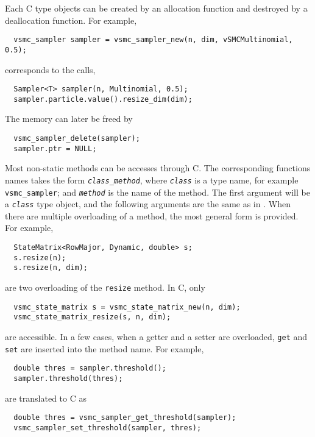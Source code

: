 Each C type objects can be created by an allocation function and destroyed by a
deallocation function. For example,
\begin{Verbatim}
  vsmc_sampler sampler = vsmc_sampler_new(n, dim, vSMCMultinomial, 0.5);
\end{Verbatim}
corresponds to the \cpp calls,
\begin{Verbatim}
  Sampler<T> sampler(n, Multinomial, 0.5);
  sampler.particle.value().resize_dim(dim);
\end{Verbatim}
The memory can later be freed by
\begin{Verbatim}
  vsmc_sampler_delete(sampler);
  sampler.ptr = NULL;
\end{Verbatim}
Most non-static methods can be accesses through C. The corresponding functions
names takes the form
\texttt{\textcolor{MRed}{\textit{class}}\_\textcolor{MRed}{\textit{method}}},
where \texttt{\textcolor{MRed}{\textit{class}}} is a type name, for example
\verb|vsmc_sampler|; and \texttt{\textcolor{MRed}{\textit{method}}} is the name
of the method. The first argument will be a
\texttt{\textcolor{MRed}{\textit{class}}} type object, and the following
arguments are the same as in \cpp. When there are multiple overloading of a
method, the most general form is provided. For example,
\begin{Verbatim}
  StateMatrix<RowMajor, Dynamic, double> s;
  s.resize(n);
  s.resize(n, dim);
\end{Verbatim}
are two overloading of the \verb|resize| method. In C, only
\begin{Verbatim}
  vsmc_state_matrix s = vsmc_state_matrix_new(n, dim);
  vsmc_state_matrix_resize(s, n, dim);
\end{Verbatim}
are accessible. In a few cases, when a getter and a setter are overloaded,
\verb|get| and \verb|set| are inserted into the method name. For example,
\begin{Verbatim}
  double thres = sampler.threshold();
  sampler.threshold(thres);
\end{Verbatim}
are translated to C as
\begin{Verbatim}
  double thres = vsmc_sampler_get_threshold(sampler);
  vsmc_sampler_set_threshold(sampler, thres);
\end{Verbatim}

